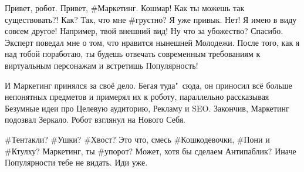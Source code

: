 {\small \begin{dialog}
\X Привет, робот.
\R Привет, \#Маркетинг.
\X Кошмар! Как ты можешь так существовать?!
\R Как? Так, что мне \#грустно? Я уже привык.
\X Нет! Я имею в виду совсем другое! Например, твой внешний вид! Ну что за убожество?
\R Спасибо.
\X Эксперт поведал мне о том, что нравится нынешней Молодежи. После того, как я над тобой поработаю, ты будешь отвечать современным требованиям к виртуальным персонажам и встретишь Популярность! 
\end{dialog}

\begin{monolog}
И Маркетинг принялся за своё дело. Бегая туда"~сюда, он приносил всё больше непонятных предметов и примерял их к роботу, параллельно рассказывая Безумные идеи про Целевую аудиторию, Рекламу и SEO. Закончив, Маркетинг подозвал Зеркало. Робот взглянул на Нового Себя.
\end{monolog}

\begin{dialog}
\R \#Тентакли? \#Ушки? \#Хвост? Это что, смесь \#Кошкодевочки, \#Пони и \#Ктулху? Маркетинг, ты \#упорот?
\X Может, хотя бы сделаем Антипаблик? Иначе Популярности тебе не видать.
\R Иди уже.
\end{dialog}
}